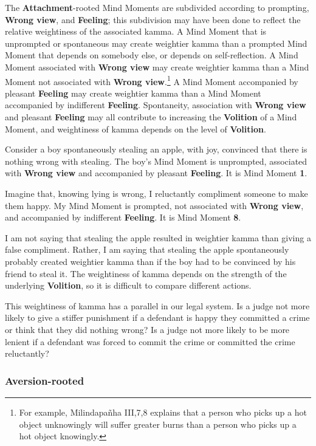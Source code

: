 The \textbf{Attachment}-rooted Mind Moments are subdivided according to prompting, \textbf{Wrong view}, and \textbf{Feeling}; this subdivision may have been done to reflect the relative weightiness of the associated kamma. A Mind Moment that is unprompted or spontaneous may create weightier kamma than a prompted Mind Moment that depends on somebody else, or depends on self-reflection. A Mind Moment associated with \textbf{Wrong view} may create weightier kamma than a Mind Moment not associated with \textbf{Wrong view}.\footnote{For example, Milindapañha III,7,8 explains that a person who picks up a hot object unknowingly will suffer greater burns than a person who picks up a hot object knowingly.} A Mind Moment accompanied by pleasant \textbf{Feeling} may create weightier kamma than a Mind Moment accompanied by indifferent \textbf{Feeling}. Spontaneity, association with \textbf{Wrong view} and pleasant \textbf{Feeling} may all contribute to increasing the \textbf{Volition} of a Mind Moment, and weightiness of kamma depends on the level of \textbf{Volition}.

\pagebreak

Consider a boy spontaneously stealing an apple, with joy, convinced that there is nothing wrong with stealing. The boy’s Mind Moment is unprompted, associated with \textbf{Wrong view} and accompanied by pleasant \textbf{Feeling}. It is Mind Moment \textbf{1}.

Imagine that, knowing lying is wrong, I reluctantly compliment someone to make them happy. My Mind Moment is prompted, not associated with \textbf{Wrong view}, and accompanied by indifferent \textbf{Feeling}. It is Mind Moment \textbf{8}.

I am not saying that stealing the apple resulted in weightier kamma than giving a false compliment. Rather, I am saying that stealing the apple spontaneously probably created weightier kamma than if the boy had to be convinced by his friend to steal it. The weightiness of kamma depends on the strength of the underlying \textbf{Volition}, so it is difficult to compare different actions.

This weightiness of kamma has a parallel in our legal system. Is a judge not more likely to give a stiffer punishment if a defendant is happy they committed a crime or think that they did nothing wrong? Is a judge not more likely to be more lenient if a defendant was forced to commit the crime or committed the crime reluctantly?

\subsubsection*{\textbf{Aversion}-rooted}

